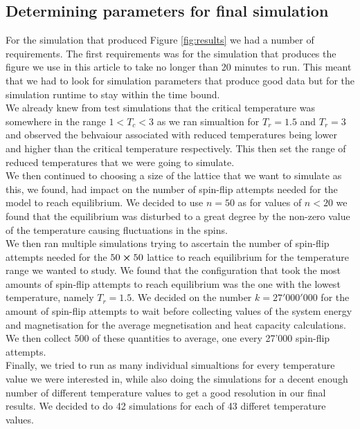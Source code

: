 \documentclass[twocolumn,a4paper,aps,amsmath,amssymb,floatfix,superscriptaddress]{revtex4-2}
\begin{document}
        \subsection{Determining parameters for final simulation}
            For the simulation that produced Figure \ref{fig:results} we had a number of requirements. The first requirements was for the simulation that produces the figure we use in this article to take no longer than 20 minutes to run. This meant that we had to look for simulation parameters that produce good data but for the simulation runtime to stay within the time bound.\\
            We already knew from test simulations that the critical temperature was somewhere in the range $1 < T_c < 3$ as we ran simualtion for $T_r = 1.5$ and $T_r = 3$ and observed the behvaiour associated with reduced temperatures being lower and higher than the critical temperature respectively. This then set the range of reduced temperatures that we were going to simulate.\\
            We then continued to choosing a size of the lattice that we want to simulate as this, we found, had impact on the number of spin-flip attempts needed for the model to reach equilibrium. We decided to use $n = 50$ as for values of $n<20$ we found that the equilibrium was disturbed to a great degree by the non-zero value of the temperature causing fluctuations in the spins.\\
            We then ran multiple simulations trying to ascertain the number of spin-flip attempts needed for the $50 \cross 50$ lattice to reach equilibrium for the temperature range we wanted to study. We found that the configuration that took the most amounts of spin-flip attempts to reach equilibrium was the one with the lowest temperature, namely $T_r = 1.5$. We decided on the number $k = 27'000'000$ for the amount of spin-flip attempts to wait before collecting values of the system energy and magnetisation for the average megnetisation and heat capacity calculations.\\
            We then collect 500 of these quantities to average, one every 27'000 spin-flip attempts.\\
            Finally, we tried to run as many individual simualtions for every temperature value we were interested in, while also doing the simulations for a decent enough number of different temperature values to get a good resolution in our final results. We decided to do 42 simulations for each of 43 differet temperature values.
\end{document}
